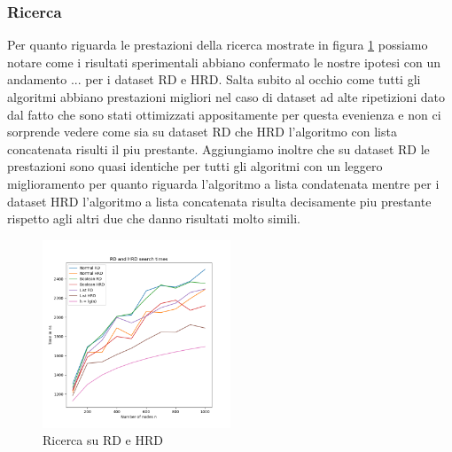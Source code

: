 \subsubsection{Ricerca}

Per quanto riguarda le prestazioni della ricerca mostrate in figura \ref{fig:RDHRDsearch} possiamo notare come i risultati sperimentali abbiano confermato le nostre
ipotesi con un andamento ... per i dataset RD e HRD.
Salta subito al occhio come tutti gli algoritmi abbiano prestazioni migliori nel caso di dataset ad alte ripetizioni dato dal fatto che sono stati ottimizzati 
appositamente per questa evenienza e non ci sorprende vedere come sia su dataset RD che HRD l'algoritmo con lista concatenata risulti il piu prestante.
Aggiungiamo inoltre che su dataset RD le prestazioni sono quasi identiche per tutti gli algoritmi con un leggero miglioramento per quanto riguarda l'algoritmo
a lista condatenata mentre per i dataset HRD l'algoritmo a lista concatenata risulta decisamente piu prestante rispetto agli altri due che danno risultati molto simili.

\begin{figure}[H]
  \centering
  \includegraphics[width=0.5\textwidth]{Resources/ABR_Resources/RDeHRDsearch.png}
  \caption{Ricerca su RD e HRD}
  \label{fig:RDHRDsearch}
\end{figure}

